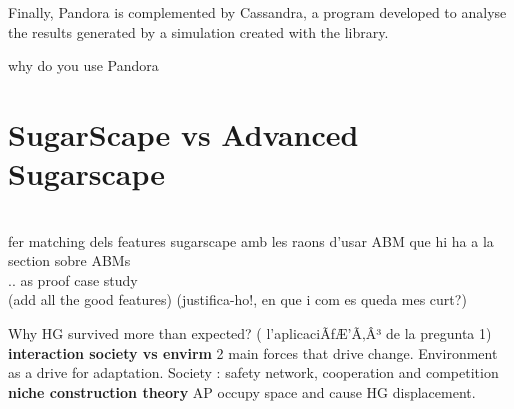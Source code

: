 \documentclass{report}
\begin{document}
\begin{enumeration}
\begin{end}
		Finally, Pandora is complemented by Cassandra, a program developed to analyse the results generated by a simulation created
		with the library. 

		why do you use Pandora

\newpage 
\chapter{SugarScape vs Advanced Sugarscape} %

\\
fer matching dels features sugarscape amb les raons d'usar ABM que hi ha
			a la section sobre ABMs
\\

 .. as proof case study
\\

		(add all the good features) (justifica-ho!, en que i com es queda mes curt?)
      
		  

		



		  Why HG survived more than expected? ( l'aplicaciÃƒÆ’Ã‚Â³ de la pregunta 1)
			\textbf{interaction society vs envirm}
				2 main forces that drive change.
				Environment as a drive for adaptation.
				Society : safety network, cooperation and competition
\\
			\textbf{niche construction theory}
				AP occupy space and cause HG displacement.
\\
\\






\end{end}
\end{enumeration}
\end{document}
